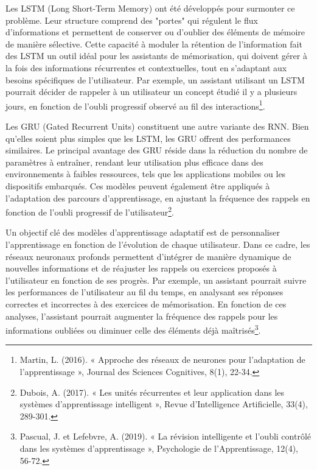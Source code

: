 \documentclass[11pt,a4paper]{report}
\begin{document}
Les LSTM (Long Short-Term Memory) ont été développés pour surmonter ce problème. Leur structure comprend des "portes" qui régulent le flux d’informations et permettent de conserver ou d’oublier des éléments de mémoire de manière sélective. Cette capacité à moduler la rétention de l’information fait des LSTM un outil idéal pour les assistants de mémorisation, qui doivent gérer à la fois des informations récurrentes et contextuelles, tout en s’adaptant aux besoins spécifiques de l'utilisateur. Par exemple, un assistant utilisant un LSTM pourrait décider de rappeler à un utilisateur un concept étudié il y a plusieurs jours, en fonction de l'oubli progressif observé au fil des interactions\footnote{Martin, L. (2016). « Approche des réseaux de neurones pour l’adaptation de l’apprentissage », Journal des Sciences Cognitives, 8(1), 22-34.}.

Les GRU (Gated Recurrent Units) constituent une autre variante des RNN. Bien qu'elles soient plus simples que les LSTM, les GRU offrent des performances similaires. Le principal avantage des GRU réside dans la réduction du nombre de paramètres à entraîner, rendant leur utilisation plus efficace dans des environnements à faibles ressources, tels que les applications mobiles ou les dispositifs embarqués. Ces modèles peuvent également être appliqués à l'adaptation des parcours d'apprentissage, en ajustant la fréquence des rappels en fonction de l’oubli progressif de l’utilisateur\footnote{Dubois, A. (2017). « Les unités récurrentes et leur application dans les systèmes d’apprentissage intelligent », Revue d’Intelligence Artificielle, 33(4), 289-301.}.

Un objectif clé des modèles d’apprentissage adaptatif est de personnaliser l’apprentissage en fonction de l’évolution de chaque utilisateur. Dans ce cadre, les réseaux neuronaux profonds permettent d'intégrer de manière dynamique de nouvelles informations et de réajuster les rappels ou exercices proposés à l'utilisateur en fonction de ses progrès. Par exemple, un assistant pourrait suivre les performances de l'utilisateur au fil du temps, en analysant ses réponses correctes et incorrectes à des exercices de mémorisation. En fonction de ces analyses, l’assistant pourrait augmenter la fréquence des rappels pour les informations oubliées ou diminuer celle des éléments déjà maîtrisés\footnote{Pascual, J. et Lefebvre, A. (2019). « La révision intelligente et l'oubli contrôlé dans les systèmes d'apprentissage », Psychologie de l’Apprentissage, 12(4), 56-72.}.
\end{document}
